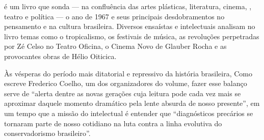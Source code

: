 \hspace*{-7cm}\hrulefill\hspace*{-7cm}

\medskip

 é um livro que sonda --- na confluência das artes plásticas, literatura, cinema, , teatro e política --- o ano de 1967 e seus principais desdobramentos no pensamento e na cultura brasileira. Diversos ensaístas e intelectuais analisam no livro temas como o tropicalismo, os festivais de música, as revoluções perpetradas por Zé Celso no Teatro Oficina, o Cinema Novo de Glauber Rocha e as provocantes obras de Hélio Oiticica.

Às vésperas do período mais ditatorial e repressivo da história brasileira,  Como escreve Frederico Coelho, um dos organizadores do volume, fazer esse balanço serve de “alerta dentre as novas gerações cuja leitura pode cada vez mais se aproximar daquele momento dramático pela lente absurda de nosso presente”, em um tempo que a missão do intelectual é entender que “diagnósticos precários se tornaram parte de nosso cotidiano na luta contra a linha evolutiva do conservadorismo brasileiro”.


\vfill
\enlargethispage{\baselineskip}

\hspace*{-.4cm}\begin{minipage}[c]{1\linewidth}
\small{
{}}
\end{minipage}

\pagebreak

\pagestyle{circuitocat}

